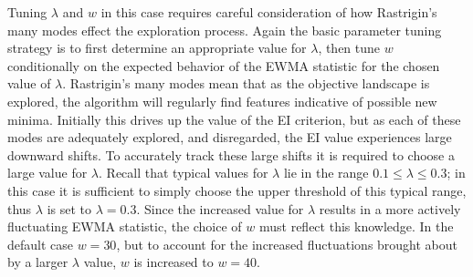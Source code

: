 \documentclass[12pt]{article}
\begin{document}
	
% 	
% 	
	
	Tuning $\lambda$ and $w$ in this case requires careful consideration of how Rastrigin's many modes effect the exploration process.
	Again the basic parameter tuning strategy is to first determine an appropriate value for $\lambda$, then tune $w$ conditionally on the expected behavior of the EWMA statistic for the chosen value of $\lambda$.
	Rastrigin's many modes mean that as the objective landscape is explored, the algorithm will regularly find features indicative of possible new minima. %
	Initially this drives up the value of the EI criterion, but as each of these modes are adequately explored, and disregarded, the EI value experiences large downward shifts.
	To accurately track these large shifts it is required to choose a large value for $\lambda$. 
	Recall that typical values for $\lambda$ lie in the range $0.1\le\lambda\le0.3$; in this case it is sufficient to simply choose the upper threshold of this typical range, thus $\lambda$ is set to $\lambda=0.3$.
	Since the increased value for $\lambda$ results in a more actively fluctuating EWMA statistic, the choice of $w$ must reflect this knowledge.
	In the default case $w=30$, but to account for the increased fluctuations brought about by a larger $\lambda$ value, $w$ is increased to $w=40$. 
	
\end{document}
